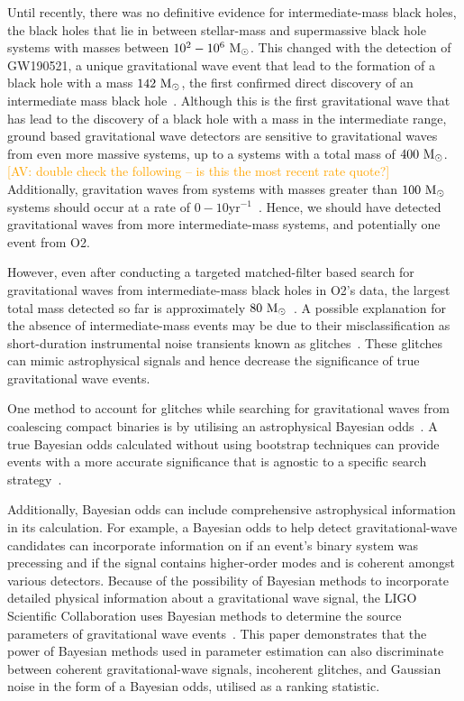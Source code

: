 \documentclass[%
 nofootinbib,
 amsmath,amssymb,
 aps,
 twocolumn
]{revtex4-2}
\newcommand{\mathcmd}[1]{{\sc \relax\ifmmode#1\else $#1$\fi}\xspace}
\newcommand{\msun}{\mathcmd{\text{M}_\odot}}
\newcommand{\av}[1]{\textcolor{orange}{[AV: #1]}}
\begin{document}
Until recently, there was no definitive evidence for intermediate-mass black holes, the black holes that lie in between stellar-mass and supermassive black hole systems with masses between $10^2-10^6\ \msun$. This changed with the detection of GW190521, a unique gravitational wave event that lead to the formation of a black hole with a mass  $142\ \msun$, the first confirmed direct discovery of an intermediate mass black hole~\cite{gw190521}. Although this is the first gravitational wave that has lead to the discovery of a black hole with a mass in the intermediate range, ground based gravitational wave detectors are sensitive to gravitational waves from even more massive systems, up to a systems with a total mass of $400\ \msun$. \av{double check the following -- is this the most recent rate quote?} Additionally, gravitation waves from systems with masses greater than $100\ \msun$ systems should occur at a rate of $0-10\text{yr}^{-1}$~\cite{fregeau2006imbhbRatePrediction, mandel2008rates,rodriguez2015bbhRatePredictions,ligo_imbh_search}. Hence, we should have detected gravitational waves from more intermediate-mass systems, and potentially one event from O2.

However, even after conducting a targeted matched-filter based search for gravitational waves from intermediate-mass black holes in O2's data, the largest total mass detected so far is approximately $80\ \msun$~\cite{GWTC1,imbhbSearch2014, ligo_imbh_search}. A possible explanation for the absence of intermediate-mass events may be due to their misclassification as short-duration instrumental noise transients known as glitches~\cite{ pycbc_short_duration_transients, pe_with_glitch, blip_glitches}. These glitches can mimic astrophysical signals and hence decrease the significance of true gravitational wave events. 

One method to account for glitches while searching for gravitational waves from coalescing compact binaries is by utilising an astrophysical Bayesian odds~\cite{bci, BCR1, BCR2, bcr_gw151216, bayesian_odds}. A true Bayesian odds calculated without using bootstrap techniques can provide events with a more accurate significance that is agnostic to a specific search strategy~\cite{BCR2, bcr_gw151216,  bayesian_odds}. 

Additionally, Bayesian odds can include comprehensive astrophysical information in its calculation. For example, a Bayesian odds to help detect gravitational-wave candidates can incorporate information on if an event's binary system was precessing and if the signal contains higher-order modes and is coherent amongst various detectors. Because of the possibility of Bayesian methods to incorporate detailed physical information about a gravitational wave signal, the LIGO Scientific Collaboration uses Bayesian methods to determine the source parameters of gravitational wave events~\cite{abbott2016ligo, GWTC1}. This paper demonstrates that the power of Bayesian methods used in parameter estimation can also discriminate between coherent gravitational-wave signals, incoherent glitches, and Gaussian noise in the form of a Bayesian odds, utilised as a ranking statistic. 
\end{document}
